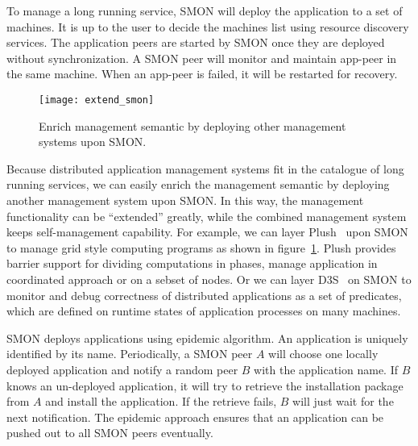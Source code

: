 To manage a long running service, SMON will deploy the
application to a set of machines. It is up to the user to
decide the machines list using resource discovery services.
The application peers are started by SMON once they are
deployed without synchronization. A SMON peer will monitor
and maintain app-peer in the same machine. When an app-peer
is failed, it will be restarted for recovery.

\begin{figure}
\centering
\texttt{[image: extend\_smon]}
\caption{Enrich management semantic by deploying other
management systems upon SMON.}
\label{fig:extend_smon}
\end{figure}

Because distributed application management systems fit in
the catalogue of long running services, we can easily enrich
the management semantic by deploying another management
system upon SMON. In this way, the management functionality
can be ``extended'' greatly, while the combined management
system keeps self-management capability. For example, we can
layer Plush~\cite{Albrecht2007} upon SMON to manage grid
style computing programs as shown in
figure~\ref{fig:extend_smon}. Plush provides barrier support
for dividing computations in phases, manage application in
coordinated approach or on a sebset of nodes. Or we can layer
D3S~\cite{Liu2008} on SMON to monitor and debug correctness
of distributed applications as a set of predicates, which
are defined on runtime states of application processes on
many machines.


SMON deploys applications using epidemic algorithm.  An
application is uniquely identified by its name.
Periodically, a SMON peer $A$ will choose one locally
deployed application and notify a random peer $B$ with the
application name. If $B$ knows an un-deployed application,
it will try to retrieve the installation package from $A$
and install the application. If the retrieve fails, $B$ will
just wait for the next notification. The epidemic approach
ensures that an application can be pushed out to all SMON
peers eventually.

